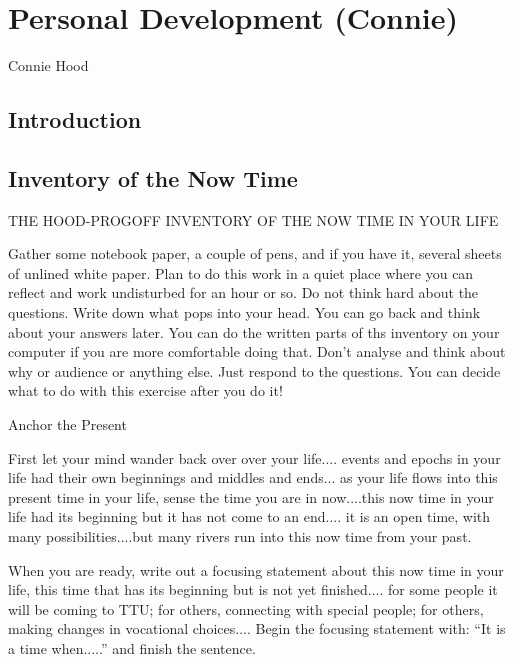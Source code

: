 \chapter{Personal Development (Connie)}

\begin{authors}
	Connie Hood
\end{authors}

\section{Introduction}

\section{Inventory of the Now Time}

\begin{center}THE HOOD-PROGOFF INVENTORY OF THE NOW TIME IN YOUR LIFE\end{center}

 Gather some notebook paper, a couple of pens, and if you have it,
 several sheets of unlined white paper. Plan to do this work in a quiet
 place where you can reflect and work undisturbed for an hour or so. Do
 not think hard about the questions. Write down what pops into your
 head. You can go back and think about your answers later. You can do
 the written parts of ths inventory on your computer if you are more
 comfortable doing that. Don't analyse and think about why or audience or
 anything else. Just respond to the questions. You can decide what to do
 with this exercise after you do it!

\medskip
 Anchor the Present
\medskip

 First let your mind wander back over over your life.... events and
 epochs in your life had their own beginnings and middles and ends...
 as your life flows into this present time in your life, sense the time
 you are in now....this now time in your life had its beginning but it
 has not come to an end.... it is an open time, with many
 possibilities....but many rivers run into this now time from your
 past.

 When you are ready, write out a focusing statement about this
 now time in your life, this time that has its beginning but is not yet
 finished.... for some people it will be coming to TTU; for others,
 connecting with special people; for others, making changes in
 vocational choices.... Begin the focusing statement with: ``It is a
 time when.....'' and finish the sentence.

